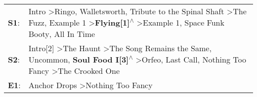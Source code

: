 \begin{supertabular}{p{0.03\textwidth}p{0.92\textwidth}}
 \textbf{S1}:  &  Intro\textsuperscript{} \textgreater \enspace Ringo\textsuperscript{}, \enspace Walletsworth\textsuperscript{}, \enspace Tribute to the Spinal Shaft\textsuperscript{} \textgreater \enspace The Fuzz\textsuperscript{}, \enspace Example 1\textsuperscript{} \textgreater \enspace \textbf{Flying[1]\textsuperscript{$\wedge$}} \textgreater \enspace Example 1\textsuperscript{}, \enspace Space Funk Booty\textsuperscript{}, \enspace All In Time\textsuperscript{}  \enspace  \\
 \textbf{S2}:  &                                Intro[2]\textsuperscript{} \textgreater \enspace The Haunt\textsuperscript{} \textgreater \enspace The Song Remains the Same\textsuperscript{}, \enspace Uncommon\textsuperscript{}, \enspace \textbf{Soul Food I[3]\textsuperscript{$\wedge$}} \textgreater \enspace Orfeo\textsuperscript{}, \enspace Last Call\textsuperscript{}, \enspace Nothing Too Fancy\textsuperscript{} \textgreater \enspace The Crooked One\textsuperscript{}  \enspace  \\
 \textbf{E1}:  &                                                                                                                                                                                                                                                                                                                                                                                 Anchor Drops\textsuperscript{} \textgreater \enspace Nothing Too Fancy\textsuperscript{}  \enspace  \\
\end{supertabular}
